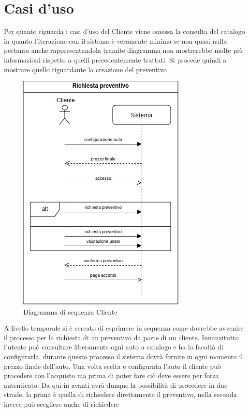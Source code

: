 \documentclass[a4paper, 11pt,oneside]{book}
\newcommand{\spacing}{\par\bigskip\noindent}
\begin{document}
    \section{Casi d'uso}
        Per quanto riguarda i casi d'uso del Cliente viene omessa la consulta del catalogo in quanto l'iterazione con il sistema è veramente minima se non quasi nulla pertanto anche rappresentandola tramite
        diagramma non mostrerebbe molte più informazioni rispetto a quelli precedentemente trattati. Si procede quindi a mostrare quello riguardante la creazione del preventivo
        \begin{figure}[H]
            \centering
            \includegraphics[scale=0.75]{sequence_diagram_preventivo.png}
            \caption{Diagramma di sequenza Cliente}
            \label{fig:diagramma_sequenza_utente}
        \end{figure}
        \spacing
        A livello temporale si è cercato di esprimere in sequenza come dovrebbe avvenire il processo per la richiesta di un preventivo da parte di un cliente.
        Innanzitutto l'utente può consultare liberamente ogni auto a catalogo e ha la facoltà di configurarla, durante questo processo il sistema dovrà fornire in ogni momento
        il prezzo finale dell'auto. Una volta scelta e configurata l'auto il cliente può procedere con l'acquisto ma prima di poter fare ciò deve essere per forza autenticato.
        Da qui in avanti avrà dunque la possibilità di procedere in due strade, la prima è quella di richiedere direttamente il preventivo, nella seconda invece può scegliere anche di richiedere 
\end{document}
